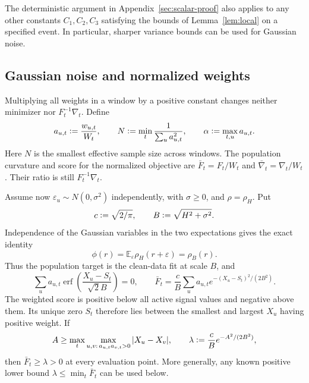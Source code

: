 \documentclass[11pt]{article}
\newcommand{\E}{\mathbb{E}}
\newcommand{\eqdef}{\mathrel{\vcentcolon=}}
\begin{document}
The deterministic argument in Appendix~\ref{sec:scalar-proof} also applies
to any other constants
\(C_1,C_2,C_3\) satisfying the bounds of Lemma~\ref{lem:local} on a specified
event.  In particular, sharper variance bounds can be used for Gaussian noise.


\subsection{Gaussian noise and normalized weights}\label{sec:gaussian}

Multiplying all weights in a window by a positive constant changes neither
minimizer nor \(F_t^{-1}\nabla_t\).  Define
\begin{equation}
  a_{u,t}\eqdef\frac{w_{u,t}}{W_t},\qquad
  N\eqdef\min_t\frac{1}{\sum_u a_{u,t}^2},\qquad
  \alpha\eqdef\max_{t,u}a_{u,t}.
  \label{eq:normalized-weights}
\end{equation}
Here \(N\) is the smallest effective sample size across windows.  The population
curvature and score for the normalized objective are
\(\bar F_t=F_t/W_t\) and \(\bar\nabla_t=\nabla_t/W_t\).
Their ratio is still \(F_t^{-1}\nabla_t\).

Assume now \(\varepsilon_u\sim N(0,\sigma^2)\) independently, with
\(\sigma\geq0\), and \(\rho=\rho_H\).  Put
\begin{equation}
  c\eqdef\sqrt{2/\pi},\qquad B\eqdef\sqrt{H^2+\sigma^2}.
  \label{eq:gaussian-scale}
\end{equation}
Independence of the Gaussian variables in the two expectations gives the exact
identity
\begin{equation}
  \phi(r)=\E_\varepsilon\rho_H(r+\varepsilon)=\rho_B(r).
  \label{eq:gaussian-convolution}
\end{equation}
Thus the population target is the clean-data fit at scale \(B\), and
\begin{equation}
  \sum_u a_{u,t}\operatorname{erf}\!\left(\frac{X_u-S_t}{\sqrt2B}\right)=0,
  \qquad
  \bar F_t=\frac cB\sum_u a_{u,t}e^{-(X_u-S_t)^2/(2B^2)}.
  \label{eq:gaussian-target}
\end{equation}
The weighted score is positive below all active signal values and negative
above them.  Its unique zero \(S_t\) therefore lies between the smallest and
largest \(X_u\) having positive weight.  If
\begin{equation}
  A\geq\max_t\max_{u,v:\,a_{u,t}a_{v,t}>0}|X_u-X_v|,
  \qquad
  \lambda\eqdef\frac cB e^{-A^2/(2B^2)},
  \label{eq:curvature-lower-bound}
\end{equation}
then \(\bar F_t\geq\lambda>0\) at every evaluation point.  More generally,
any known positive lower bound \(\lambda\leq\min_t\bar F_t\) can be used below.
\end{document}

